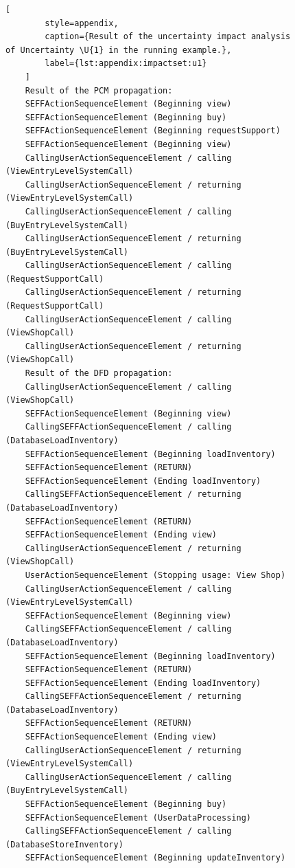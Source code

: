 \begin{figure}
    \begin{lstlisting}[
        style=appendix,
        caption={Result of the uncertainty impact analysis of Uncertainty \U{1} in the running example.},
        label={lst:appendix:impactset:u1}
    ]
    Result of the PCM propagation:
    SEFFActionSequenceElement (Beginning view)
    SEFFActionSequenceElement (Beginning buy)
    SEFFActionSequenceElement (Beginning requestSupport)
    SEFFActionSequenceElement (Beginning view)
    CallingUserActionSequenceElement / calling (ViewEntryLevelSystemCall)
    CallingUserActionSequenceElement / returning (ViewEntryLevelSystemCall)
    CallingUserActionSequenceElement / calling (BuyEntryLevelSystemCall)
    CallingUserActionSequenceElement / returning (BuyEntryLevelSystemCall)
    CallingUserActionSequenceElement / calling (RequestSupportCall)
    CallingUserActionSequenceElement / returning (RequestSupportCall)
    CallingUserActionSequenceElement / calling (ViewShopCall)
    CallingUserActionSequenceElement / returning (ViewShopCall)
    Result of the DFD propagation:
    CallingUserActionSequenceElement / calling (ViewShopCall)
    SEFFActionSequenceElement (Beginning view)
    CallingSEFFActionSequenceElement / calling (DatabaseLoadInventory)
    SEFFActionSequenceElement (Beginning loadInventory)
    SEFFActionSequenceElement (RETURN)
    SEFFActionSequenceElement (Ending loadInventory)
    CallingSEFFActionSequenceElement / returning (DatabaseLoadInventory)
    SEFFActionSequenceElement (RETURN)
    SEFFActionSequenceElement (Ending view)
    CallingUserActionSequenceElement / returning (ViewShopCall)
    UserActionSequenceElement (Stopping usage: View Shop)
    CallingUserActionSequenceElement / calling (ViewEntryLevelSystemCall)
    SEFFActionSequenceElement (Beginning view)
    CallingSEFFActionSequenceElement / calling (DatabaseLoadInventory)
    SEFFActionSequenceElement (Beginning loadInventory)
    SEFFActionSequenceElement (RETURN)
    SEFFActionSequenceElement (Ending loadInventory)
    CallingSEFFActionSequenceElement / returning (DatabaseLoadInventory)
    SEFFActionSequenceElement (RETURN)
    SEFFActionSequenceElement (Ending view)
    CallingUserActionSequenceElement / returning (ViewEntryLevelSystemCall)
    CallingUserActionSequenceElement / calling (BuyEntryLevelSystemCall)
    SEFFActionSequenceElement (Beginning buy)
    SEFFActionSequenceElement (UserDataProcessing)
    CallingSEFFActionSequenceElement / calling (DatabaseStoreInventory)
    SEFFActionSequenceElement (Beginning updateInventory)

\end{lstlisting}
\end{figure}
